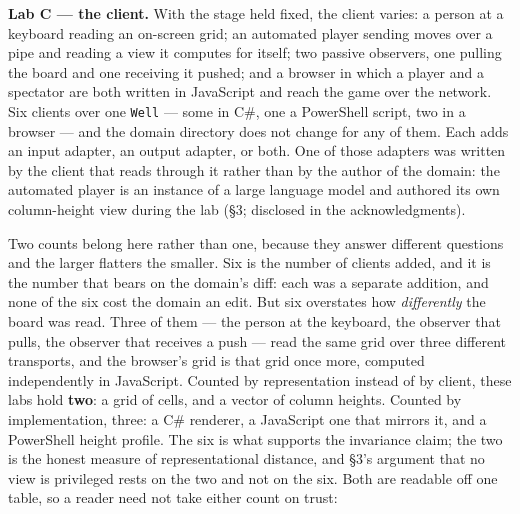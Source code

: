 \documentclass[
]{article}
\newcounter{none} %
\begin{document}
\textbf{Lab C --- the client.} With the stage held fixed, the client
varies: a person at a keyboard reading an on-screen grid; an automated
player sending moves over a pipe and reading a view it computes for
itself; two passive observers, one pulling the board and one receiving
it pushed; and a browser in which a player and a spectator are both
written in JavaScript and reach the game over the network. Six clients
over one \texttt{Well} --- some in C\#, one a PowerShell script, two in
a browser --- and the domain directory does not change for any of them.
Each adds an input adapter, an output adapter, or both. One of those
adapters was written by the client that reads through it rather than by
the author of the domain: the automated player is an instance of a large
language model and authored its own column-height view during the lab
(§3; disclosed in the acknowledgments).

Two counts belong here rather than one, because they answer different
questions and the larger flatters the smaller. Six is the number of
clients added, and it is the number that bears on the domain's diff:
each was a separate addition, and none of the six cost the domain an
edit. But six overstates how \emph{differently} the board was read.
Three of them --- the person at the keyboard, the observer that pulls,
the observer that receives a push --- read the same grid over three
different transports, and the browser's grid is that grid once more,
computed independently in JavaScript. Counted by representation instead
of by client, these labs hold \textbf{two}: a grid of cells, and a
vector of column heights. Counted by implementation, three: a C\#
renderer, a JavaScript one that mirrors it, and a PowerShell height
profile. The six is what supports the invariance claim; the two is the
honest measure of representational distance, and §3's argument that no
view is privileged rests on the two and not on the six. Both are
readable off one table, so a reader need not take either count on trust:
\end{document}
